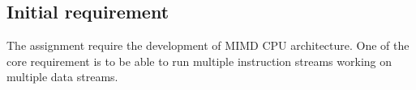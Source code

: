 \subsection {Initial requirement}
The assignment require the development of MIMD CPU architecture. One of the core requirement is to be able to run multiple instruction streams working on multiple data streams. 
